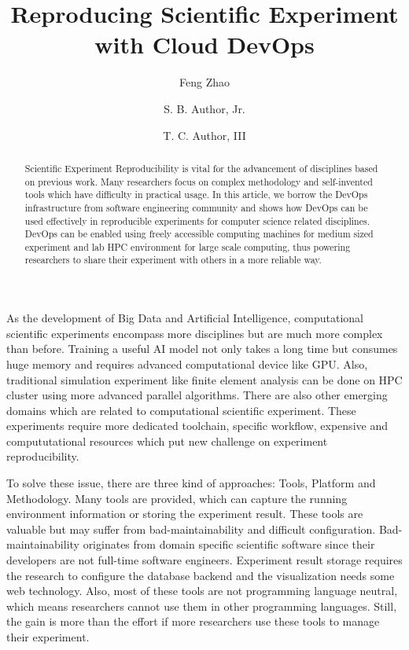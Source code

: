 \documentclass{IEEEcsmag}
\begin{document}

\title{Reproducing Scientific Experiment with Cloud DevOps}

\author{Feng Zhao}

\author{S. B. Author, Jr.}

\author{T. C. Author, III}


\begin{abstract}
Scientific Experiment Reproducibility is vital for the advancement of disciplines based on previous work. Many researchers focus on complex methodology and self-invented tools which have difficulty in practical usage. In this article, we borrow the DevOps infrastructure from software engineering community and shows how DevOps can be used effectively in reproducible experiments for computer science related disciplines. DevOps can be enabled using freely accessible computing machines for medium sized experiment and lab HPC environment for large scale computing, thus powering researchers to share their experiment with others in a more reliable way.
\end{abstract}

\maketitle

 As the development of Big Data and Artificial Intelligence, computational scientific experiments encompass more disciplines but are much more complex than before. Training a useful AI model not only takes a long time but consumes huge memory and requires advanced computational device like GPU. Also, traditional simulation experiment like finite element analysis can be done on HPC cluster using more advanced parallel algorithms. There are also other emerging domains which are related to computational scientific experiment. These experiments require more dedicated toolchain, specific workflow, expensive and compututational resources which put new challenge on experiment reproducibility.

To solve these issue, there are three kind of approaches: Tools, Platform and Methodology. Many tools \cite{greff2017sacred} are provided, which can capture the running environment information or storing the experiment result. These tools are valuable but may suffer from bad-maintainability and difficult configuration. Bad-maintainability originates from domain specific scientific software since their developers are not full-time software engineers. Experiment result storage requires the research to configure the database backend and the visualization needs some web technology. Also, most of these tools are not programming language neutral, which means researchers cannot use them in other programming languages. Still, the gain is more than the effort if more researchers use these tools to manage their experiment.
\end{document}

